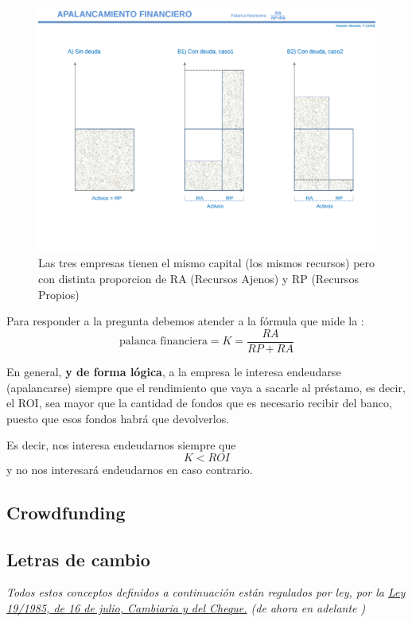 \documentclass[nochap,palatino,shortheader]{apuntes}
\newcommand{\study}[1]{#1} \newcommand{\substudy}[1]{#1}
\begin{document}
\begin{figure}[hbtp]
\centering
\includegraphics[width=\textwidth]{img/apalancamiento.png}
\caption{Las tres empresas tienen el mismo capital (los mismos recursos) pero con distinta proporcion de RA (Recursos Ajenos) y RP (Recursos Propios)}
\label{fig:ApalancamientoFinanciero}
\end{figure}

Para responder a la pregunta debemos atender a la fórmula que mide la :
\[\text{\study{palanca financiera}} = K = \frac{RA}{RP+RA}\]

En general, \textbf{y de forma lógica}, a la empresa le interesa endeudarse (apalancarse) siempre que el rendimiento que vaya a sacarle al préstamo, es decir, el ROI, sea mayor que la cantidad de fondos que es necesario recibir del banco, puesto que esos fondos habrá que devolverlos.

Es decir, nos interesa endeudarnos siempre que
\[K < ROI\]
y no nos interesará endeudarnos en caso contrario.

\subsection{Crowdfunding}




\subsection{Letras de cambio}

\textit{Todos estos conceptos definidos a continuación están regulados por ley, por la \href{https://www.boe.es/buscar/act.php?id=BOE-A-1985-14880&p=20150703&tn=2}{Ley 19/1985, de 16 de julio, Cambiaria y del Cheque.} (de ahora en adelante )}
\end{document}
